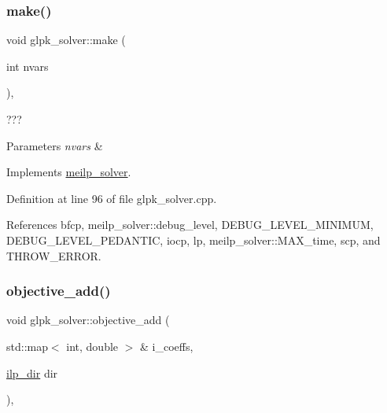 \subsubsection{\texorpdfstring{make()}{make()}}
{\footnotesize\ttfamily void glpk\+\_\+solver\+::make (\begin{DoxyParamCaption}\item[{int}]{nvars }\end{DoxyParamCaption})\hspace{0.3cm}{\ttfamily [override]}, {\ttfamily [virtual]}}



??? 


\begin{DoxyParams}{Parameters}
{\em nvars} & \\
\hline
\end{DoxyParams}


Implements \hyperlink{classmeilp__solver_a8cde2beaa61da22aaec664f3f9a0d253}{meilp\+\_\+solver}.



Definition at line 96 of file glpk\+\_\+solver.\+cpp.



References bfcp, meilp\+\_\+solver\+::debug\+\_\+level, D\+E\+B\+U\+G\+\_\+\+L\+E\+V\+E\+L\+\_\+\+M\+I\+N\+I\+M\+UM, D\+E\+B\+U\+G\+\_\+\+L\+E\+V\+E\+L\+\_\+\+P\+E\+D\+A\+N\+T\+IC, iocp, lp, meilp\+\_\+solver\+::\+M\+A\+X\+\_\+time, scp, and T\+H\+R\+O\+W\+\_\+\+E\+R\+R\+OR.

\mbox{\label{classglpk__solver_ac1a448337e6c26eae851c455091d699a}} 
\subsubsection{\texorpdfstring{objective\+\_\+add()}{objective\_add()}}
{\footnotesize\ttfamily void glpk\+\_\+solver\+::objective\+\_\+add (\begin{DoxyParamCaption}\item[{std\+::map$<$ int, double $>$ \&}]{i\+\_\+coeffs,  }\item[{\hyperlink{classmeilp__solver_a2f719db6577d73007d942af7e6fe907c}{ilp\+\_\+dir}}]{dir }\end{DoxyParamCaption})\hspace{0.3cm}{\ttfamily [override]}, {\ttfamily [virtual]}}




